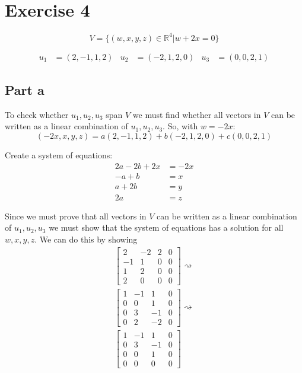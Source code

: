 \section{Exercise 4}
\[
	V = \{(w,x,y,z) \in \mathbb{R}^4 | w+2x = 0\}
\]

\begin{align*}
	u_1 & = (2,-1,1,2) &
	u_2 & = (-2,1,2,0) &
	u_3 & = (0,0,2,1)
\end{align*}

\subsection{Part a}
To check whether $u_1,u_2,u_3$ span $V$ we must find whether all vectors in $V$ can be written as a linear combination of $u_1,u_2,u_3$. So, with $w=-2x$:
\[
	(-2x,x,y,z) = a(2,-1,1,2) + b(-2,1,2,0) + c(0,0,2,1)
\]

Create a system of equations:
\begin{align*}
	2a-2b+2x & = -2x \\
	-a+b     & = x   \\
	a+2b     & = y   \\
	2a       & = z
\end{align*}

Since we must prove that all vectors in $V$ can be written as a linear combination of $u_1,u_2,u_3$ we must show that the system of equations has a solution for all $w,x,y,z$. We can do this by showing
\begin{align*}
	\begin{bmatrix}
		2  & -2 & 2 & 0 \\
		-1 & 1  & 0 & 0 \\
		1  & 2  & 0 & 0 \\
		2  & 0  & 0 & 0
	\end{bmatrix} \rightsquigarrow \\
	\begin{bmatrix}
		1 & -1 & 1  & 0 \\
		0 & 0  & 1  & 0 \\
		0 & 3  & -1 & 0 \\
		0 & 2  & -2 & 0
	\end{bmatrix} \rightsquigarrow \\
	\begin{bmatrix}
		1 & -1 & 1  & 0 \\
		0 & 3  & -1 & 0 \\
		0 & 0  & 1  & 0 \\
		0 & 0  & 0  & 0
	\end{bmatrix}
\end{align*}
